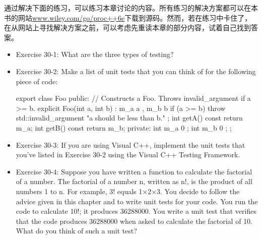 通过解决下面的练习，可以练习本章讨论的内容。所有练习的解决方案都可以在本书的网站\url{www.wiley.com/go/proc++6e}下载到源码。然而，若在练习中卡住了，在从网站上寻找解决方案之前，可以考虑先重读本章的部分内容，试着自己找到答案。

\begin{itemize}
\item
Exercise 30-1: What are the three types of testing?

\item
Exercise 30-2: Make a list of unit tests that you can think of for the following piece of code:

\begin{cpp}
export class Foo
{
    public:
        // Constructs a Foo. Throws invalid_argument if a >= b.
        explicit Foo(int a, int b) : m_a { a }, m_b { b }
        {
            if (a >= b) {
                throw std::invalid_argument { "a should be less than b." };
            }
        }
        int getA() const { return m_a; }
        int getB() const { return m_b; }
    private:
        int m_a { 0 };
        int m_b { 0 };
};
\end{cpp}

\item
Exercise 30-3: If you are using Visual C++, implement the unit tests that you’ve listed in Exercise 30-2 using the Visual C++ Testing Framework.

\item
Exercise 30-4: Suppose you have written a function to calculate the factorial of a number.
The factorial of a number n, written as n!, is the product of all numbers 1 to n. For example, 3! equals 1×2×3. You decide to follow the advice given in this chapter and to write unit tests for your code. You run the code to calculate 10!; it produces 36288000. You write a unit test that verifies that the code produces 36288000 when asked to calculate the factorial of 10. What do you think of such a unit test?
\end{itemize}
